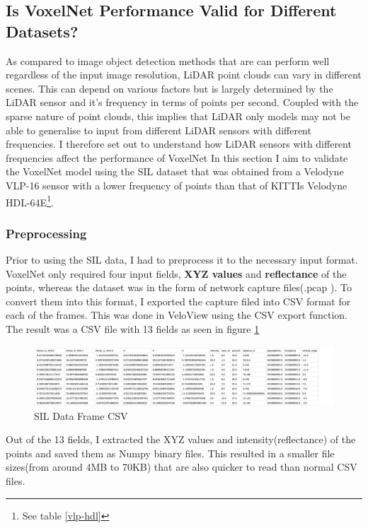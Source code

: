 \subsection{Is VoxelNet Performance Valid for Different Datasets?}
As compared to image object detection methods that are can perform well regardless of  the input image resolution, LiDAR point clouds can vary in different scenes. This can depend on various factors but is largely determined by the LiDAR sensor and it's frequency in terms of points per second. Coupled with the sparse nature of point clouds, this implies that LiDAR only models may not be able to generalise to input from different LiDAR sensors with different frequencies. I  therefore set out to understand how LiDAR sensors with different frequencies affect the performance of VoxelNet
In this section I aim to validate the VoxelNet model using the SIL dataset that was obtained from a Velodyne VLP-16 sensor with a lower frequency of points than that of KITTIs Velodyne HDL-64E\footnote{See table \ref{vlp-hdl}}.
\subsubsection*{Preprocessing}
Prior to using the SIL data, I had to preprocess it to the necessary input format. 
VoxelNet only required four input fields, \textbf{XYZ values} and \textbf{reflectance} of the points, whereas the dataset was in the form of network capture files(.pcap ). To convert them into this format, I exported the capture filed into CSV format for each of the frames. This was done  in VeloView using the CSV export function. The result was a CSV file with 13 fields as seen in figure \ref{fig:sildata}

\begin{figure}[h]
	\includegraphics[width=\linewidth]{images/sildata.png}
	\caption{SIL Data Frame CSV}
	\label{fig:sildata}
\end{figure}

Out of the 13 fields, I extracted the XYZ values and intensity(reflectance) of the points and saved them as Numpy binary files. This resulted in a smaller file sizes(from around 4MB to 70KB) that are also quicker to read than normal CSV files.

